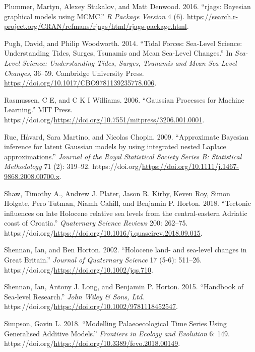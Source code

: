 \begin{CSLReferences}{1}{0}
\leavevmode{}%
Plummer, Martyn, Alexey Stukalov, and Matt Denwood. 2016. {``{rjags: Bayesian graphical models using MCMC}.''} \emph{R Package Version} 4 (6). \url{https://search.r-project.org/CRAN/refmans/rjags/html/rjags-package.html}.

\leavevmode{}%
Pugh, David, and Philip Woodworth. 2014. {``Tidal Forces: Sea-Level Science: Understanding Tides, Surges, Tsunamis and Mean Sea-Level Changes.''} In \emph{Sea-Level Science: Understanding Tides, Surges, Tsunamis and Mean Sea-Level Changes}, 36--59. Cambridge University Press. \url{https://doi.org/10.1017/CBO9781139235778.006}.

\leavevmode{}%
Rasmussen, C E, and C K I Williams. 2006. {``{Gaussian Processes for Machine Learning}.''} MIT Press. https://doi.org/\url{https://doi.org/10.7551/mitpress/3206.001.0001}.

\leavevmode{}%
Rue, Håvard, Sara Martino, and Nicolas Chopin. 2009. {``{Approximate Bayesian inference for latent Gaussian models by using integrated nested Laplace approximations}.''} \emph{Journal of the Royal Statistical Society Series B: Statistical Methodology} 71 (2): 319--92. https://doi.org/\url{https://doi.org/10.1111/j.1467-9868.2008.00700.x}.

\leavevmode{}%
Shaw, Timothy A., Andrew J. Plater, Jason R. Kirby, Keven Roy, Simon Holgate, Pero Tutman, Niamh Cahill, and Benjamin P. Horton. 2018. {``{Tectonic influences on late Holocene relative sea levels from the central-eastern Adriatic coast of Croatia}.''} \emph{Quaternary Science Reviews} 200: 262--75. https://doi.org/\url{https://doi.org/10.1016/j.quascirev.2018.09.015}.

\leavevmode{}%
Shennan, Ian, and Ben Horton. 2002. {``{Holocene land- and sea-level changes in Great Britain}.''} \emph{{Journal of Quaternary Science}} 17 (5-6): 511--26. https://doi.org/\url{https://doi.org/10.1002/jqs.710}.

\leavevmode{}%
Shennan, Ian, Antony J. Long, and Benjamin P. Horton. 2015. {``Handbook of Sea‐level Research.''} \emph{John Wiley \& Sons, Ltd}. https://doi.org/\url{https://doi.org/10.1002/9781118452547}.

\leavevmode{}%
Simpson, Gavin L. 2018. {``Modelling Palaeoecological Time Series Using Generalised Additive Models.''} \emph{Frontiers in Ecology and Evolution} 6: 149. https://doi.org/\url{https://doi.org/10.3389/fevo.2018.00149}.


\end{CSLReferences}
